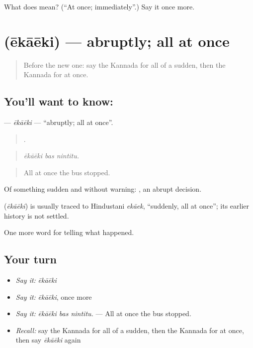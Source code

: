 \begin{tcolorbox}[breakable,colback=teal!4,colframe=teal!35!black,title={Before you move on}]
What does  mean? (\textquotedblleft{}At once; immediately\textquotedblright{}.) Say it once more.
\end{tcolorbox}
\section[\texorpdfstring{\kn{ಏಕಾಏಕಿ} (ēkāēki)}{ಏಕಾಏಕಿ (ēkāēki)}]{ (ēkāēki) — abruptly; all at once}

\label{lesson:KA-C327-ekaeki}



\begin{quote}
Before the new one: say the Kannada for all of a sudden, then the Kannada for at once.
\end{quote}

\subsection*{You'll want to know: }
\textbf{} — \emph{ēkāēki} — \textquotedblleft{}abruptly; all at once\textquotedblright{}.

\begin{quote}
  .
\end{quote}

\begin{quote}
\emph{ēkāēki bas nintitu.}
\end{quote}

\begin{quote}
All at once the bus stopped.
\end{quote}

Of something sudden and without warning:  , an abrupt decision.

\begin{cousinweb}
\textbf{} (\emph{ēkāēki}) is usually traced to Hindustani \emph{ekāek}, \textquotedblleft{}suddenly, all at once\textquotedblright{}; its earlier history is not settled.
\end{cousinweb}

\begin{grammarlens}[title={What you've built}]
One more word for telling what happened.
\end{grammarlens}

\subsection*{Your turn}
\begin{itemize}
\raggedright
  \item \emph{Say it:} \emph{ēkāēki}
  \item \emph{Say it:} \emph{ēkāēki}, once more
  \item \emph{Say it:} \emph{ēkāēki bas nintitu.} — All at once the bus stopped.
  \item \emph{Recall:} say the Kannada for all of a sudden, then the Kannada for at once, then say \emph{ēkāēki} again
\end{itemize}

